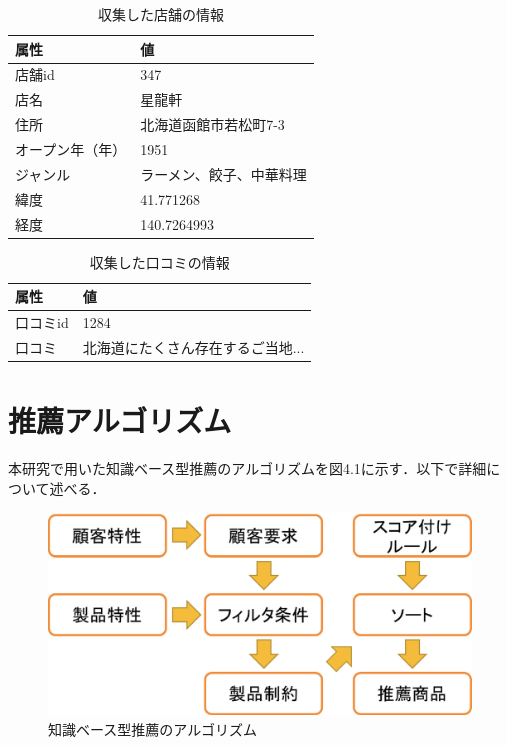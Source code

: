 \documentclass{funthesis}
\begin{document}
\begin{table}[htb]
  \begin{center}
  \scriptsize
    \caption{収集した店舗の情報}
    \normalsize
   \begin{tabular}{p{6cm}|p{6cm}}
    \hline
属性 & 値 \\ \hline\hline
      店舗id & 347 \\ \hline
      店名 & 星龍軒 \\ \hline
      住所 &  北海道函館市若松町7-3\\ \hline
      オープン年（年）& 1951 \\ \hline
      ジャンル & ラーメン、餃子、中華料理 \\ \hline
      緯度 & 41.771268 \\ \hline
      経度 & 140.7264993 \\ \hline
  \end{tabular}
  \end{center}
\end{table}

\begin{table}[htb]
  \begin{center}
  \scriptsize
    \caption{収集した口コミの情報}
    \normalsize
   \begin{tabular}{p{6cm}|p{6cm}}
    \hline
属性 & 値 \\ \hline\hline
      口コミid &1284\\ \hline
      口コミ & 北海道にたくさん存在するご当地... \\ \hline
  \end{tabular}
  \end{center}
\end{table}


\section{推薦アルゴリズム}
本研究で用いた知識ベース型推薦のアルゴリズムを図4.1に示す．以下で詳細について述べる．

\begin{figure}[tbp]
  \begin{center}
    \includegraphics[clip,width=13cm]{model.eps}
    \caption{知識ベース型推薦のアルゴリズム}
  \end{center}
\end{figure}
\end{document}
